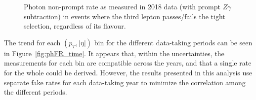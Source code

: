 \begin{figure}
%
\caption{Photon non-prompt rate as measured in 2018 data (with prompt $Z\gamma$ subtraction) in events where the third lepton passes/fails the tight selection, regardless of its flavour.}
\label{fig:phFR_PF}
\end{figure}

The trend for each $(p_{T}, |\eta|)$ bin for the different data-taking periods can be seen in Figure~\ref{fig:phFR_time}.
It appears that, within the uncertainties, the measurements for each bin are compatible across the years,
and that a single rate for the whole  could be derived.
However, the results presented in this analysis use separate fake rates for each data-taking year
to minimize the correlation among the different periods.

